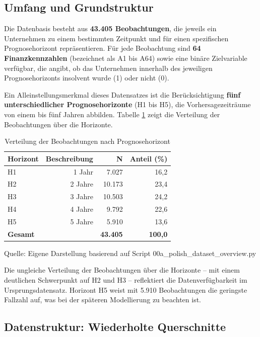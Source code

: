 \subsection{Umfang und Grundstruktur}

Die Datenbasis besteht aus \textbf{43.405 Beobachtungen}, die jeweils ein Unternehmen zu einem bestimmten Zeitpunkt und für einen spezifischen Prognosehorizont repräsentieren. Für jede Beobachtung sind \textbf{64 Finanzkennzahlen} (bezeichnet als A1 bis A64) sowie eine binäre Zielvariable verfügbar, die angibt, ob das Unternehmen innerhalb des jeweiligen Prognosehorizonts insolvent wurde (1) oder nicht (0).

Ein Alleinstellungsmerkmal dieses Datensatzes ist die Berücksichtigung \textbf{fünf unterschiedlicher Prognosehorizonte} (H1 bis H5), die Vorhersagezeiträume von einem bis fünf Jahren abbilden. Tabelle \ref{tab:datenstruktur} zeigt die Verteilung der Beobachtungen über die Horizonte.

\begin{table}[htbp]
\centering
\caption{Verteilung der Beobachtungen nach Prognosehorizont}
\label{tab:datenstruktur}
\begin{tabular}{lrrr}
\toprule
\textbf{Horizont} & \textbf{Beschreibung} & \textbf{N} & \textbf{Anteil (\%)} \\
\midrule
H1 & 1 Jahr & 7.027 & 16,2 \\
H2 & 2 Jahre & 10.173 & 23,4 \\
H3 & 3 Jahre & 10.503 & 24,2 \\
H4 & 4 Jahre & 9.792 & 22,6 \\
H5 & 5 Jahre & 5.910 & 13,6 \\
\midrule
\textbf{Gesamt} & & \textbf{43.405} & \textbf{100,0} \\
\bottomrule
\end{tabular}
\par\smallskip
{\footnotesize Quelle: Eigene Darstellung basierend auf Script 00a\_polish\_dataset\_overview.py}
\end{table}

Die ungleiche Verteilung der Beobachtungen über die Horizonte – mit einem deutlichen Schwerpunkt auf H2 und H3 – reflektiert die Datenverfügbarkeit im Ursprungsdatensatz. Horizont H5 weist mit 5.910 Beobachtungen die geringste Fallzahl auf, was bei der späteren Modellierung zu beachten ist.

\subsection{Datenstruktur: Wiederholte Querschnitte}

